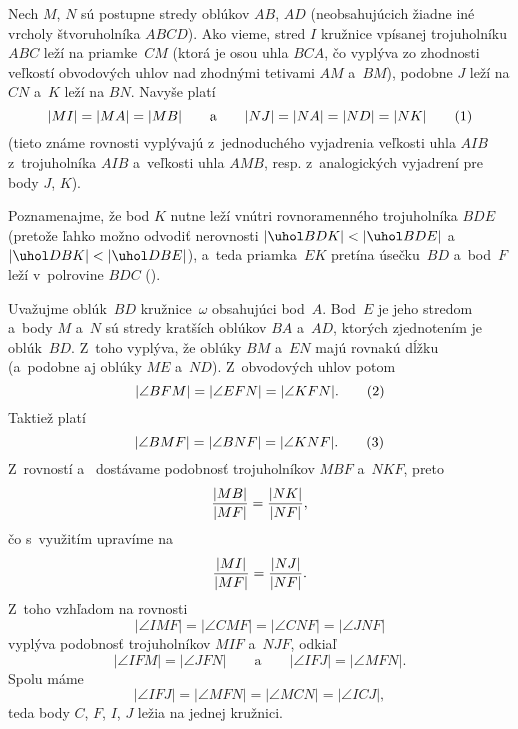{%
Nech $M$, $N$ sú postupne stredy oblúkov $AB$, $AD$ (neobsahujúcich žiadne iné vrcholy štvoruholníka $ABCD$).
Ako vieme, stred $I$ kružnice vpísanej trojuholníku $ABC$ leží na priamke~$CM$ (ktorá je osou uhla $BCA$, čo vyplýva zo zhodnosti veľkostí obvodových uhlov nad zhodnými tetivami $AM$ a~$BM$), podobne $J$ leží na $CN$ a~$K$ leží na $BN$. Navyše platí
$$
|MI|=|MA|=|MB| \qquad\text{a}\qquad |NJ|=|NA|=|ND|=|NK|
\tag1
$$
(tieto známe rovnosti vyplývajú z~jednoduchého vyjadrenia veľkosti uhla $AIB$ z~trojuholníka $AIB$ a~veľkosti uhla $AMB$, resp. z~analogických vyjadrení pre body $J$, $K$).

Poznamenajme, že bod $K$ nutne leží vnútri rovnoramenného trojuholníka $BDE$ (pretože ľahko možno odvodiť nerovnosti $|\uhol BDK|<|\uhol BDE|$ a~$|\uhol DBK|<|\uhol DBE|$),
a~teda priamka~$EK$ pretína úsečku~$BD$ a~bod~$F$ leží v~polrovine $BDC$ (\obr).
%

Uvažujme oblúk~$BD$ kružnice~$\omega$ obsahujúci bod~$A$.
Bod~$E$ je jeho stredom a~body $M$ a~$N$ sú stredy kratších oblúkov $BA$ a~$AD$, ktorých zjednotením je oblúk~$BD$.
Z~toho vyplýva, že oblúky $BM$ a~$EN$ majú rovnakú dĺžku (a~podobne aj oblúky $ME$ a~$ND$). Z~obvodových uhlov potom
$$
|\angle BFM|=|\angle EFN|=|\angle KFN|.
\tag2
$$
Taktiež platí
$$
|\angle BMF|=|\angle BNF|=|\angle KNF|.
\tag3
$$
Z~rovností  a~ dostávame podobnosť trojuholníkov
$MBF$ a~$NKF$, preto
$$
{|MB|\over |MF|}={|NK|\over |NF|},
$$
čo s~využitím  upravíme na
$$
{|MI|\over |MF|}={|NJ|\over |NF|}.
$$
Z~toho vzhľadom na rovnosti
$$
|\angle IMF|=|\angle CMF|=|\angle CNF|=|\angle JNF|
$$
vyplýva podobnosť trojuholníkov $MIF$ a~$NJF$,
odkiaľ
$$
|\angle IFM|=|\angle JFN| \qquad\text{a}\qquad
|\angle IFJ|=|\angle MFN|.
$$
Spolu máme
$$
|\angle IFJ|=|\angle MFN|=|\angle MCN|=|\angle ICJ|,
$$
teda body $C$, $F$, $I$, $J$ ležia na jednej kružnici.
}

